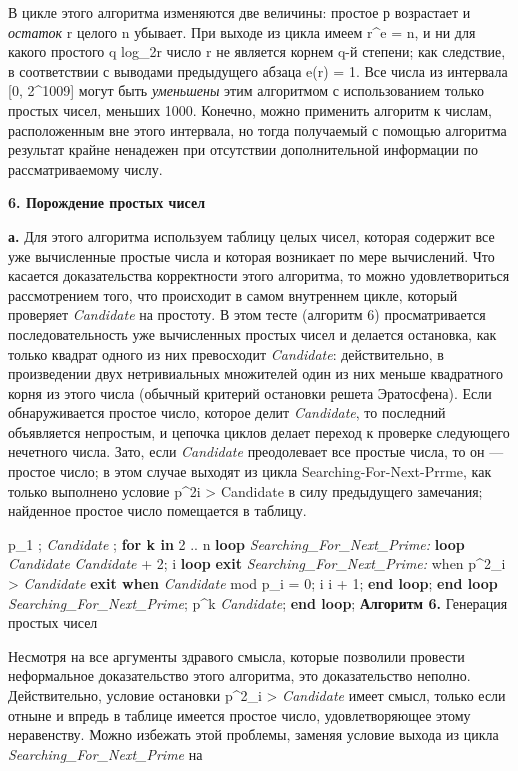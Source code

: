 В цикле этого алгоритма изменяются две величины: простое р возрастает и \textit{остаток} r целого n убывает. При выходе из цикла имеем r^{e} = n, и ни для какого простого q \leqslant \lfloor log_{2}r \rfloor число r не является корнем q-й степени; как следствие, в соответствии с выводами предыдущего абзаца e(r) = 1.
Все числа из интервала [0, 2^{1009}] могут быть \textit{уменьшены} этим алгоритмом с использованием только простых чисел, меньших 1000. Конечно, можно применить алгоритм к числам, расположенным вне этого интервала, но тогда получаемый с помощью алгоритма результат крайне ненадежен при отсутствии дополнительной информации по рассматриваемому числу.

\textbf{6. Порождение простых чисел}

\textbf{а.} Для этого алгоритма используем таблицу целых чисел, которая содержит все уже вычисленные простые числа и которая возникает по мере вычислений. Что касается доказательства корректности этого алгоритма, то можно удовлетвориться рассмотрением того, что происходит в самом внутреннем цикле, который проверяет \textit{Candidate} на простоту.
В этом тесте (алгоритм 6) просматривается последовательность уже вычисленных простых чисел и делается остановка, как только квадрат одного из них превосходит \textit{Candidate}: действительно, в произведении двух нетривиальных множителей один из них меньше квадратного корня из этого числа (обычный критерий остановки решета Эратосфена).
Если обнаруживается простое число, которое делит \textit{Candidate}, то последний объявляется непростым, и цепочка циклов делает переход к проверке следующего нечетного числа. Зато, если \textit{Candidate} преодолевает все простые числа, то он — простое число; в этом случае выходят из цикла Searching-For-Next-Prrme, как только выполнено условие p^{2}i > Candidate в силу предыдущего замечания; найденное простое число помещается в таблицу.

p_{1} ; \textit{Candidate} ;
\textbf{for k in} 2 .. n \textbf{loop}
\textit{Searching_For_Next_Prime: }\textbf{loop}
\textit{Candidate} \longleftarrow \textit{Candidate} + 2; i 
\textbf{loop}
\textbf{exit} \textit{Searching_For_Next_Prime:} when p^{2}_{i} > \textit{Candidate}
\textbf{exit when} \textit{Candidate} mod p_{i} = 0;
i \longleftarrow i + 1;
\textbf{end loop};
\textbf{end loop} \textit{Searching_For_Next_Prime};
p^{k} \longleftarrow \textit{Candidate};
\textbf{end loop};
\textbf{Алгоритм 6.} Генерация простых чисел

Несмотря на все аргументы здравого смысла, которые позволили провести неформальное доказательство этого алгоритма, это доказательство неполно. Действительно, условие остановки p^{2}_{i} > \textit{Candidate} имеет смысл, только если отныне и впредь в таблице имеется простое число, удовлетворяющее этому неравенству. Можно избежать этой проблемы, заменяя условие выхода из цикла \textit{Searching_For_Next_Prime} на

